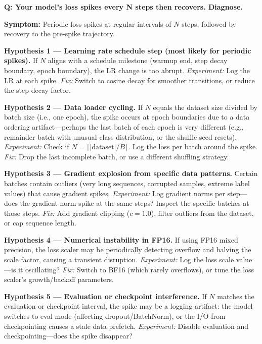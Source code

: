 \begin{interviewq}
\textbf{Q: Your model's loss spikes every N steps then recovers. Diagnose.}

 \quad {} \quad \badgefreq{\freqmed}

\stronganswer

\textbf{Symptom:} Periodic loss spikes at regular intervals of $N$ steps, followed by recovery to the pre-spike trajectory.

\textbf{Hypothesis 1 --- Learning rate schedule step (most likely for periodic spikes).} If $N$ aligns with a schedule milestone (warmup end, step decay boundary, epoch boundary), the LR change is too abrupt. \textit{Experiment:} Log the LR at each spike. \textit{Fix:} Switch to cosine decay for smoother transitions, or reduce the step decay factor.

\textbf{Hypothesis 2 --- Data loader cycling.} If $N$ equals the dataset size divided by batch size (i.e., one epoch), the spike occurs at epoch boundaries due to a data ordering artifact---perhaps the last batch of each epoch is very different (e.g., remainder batch with unusual class distribution, or the shuffle seed resets). \textit{Experiment:} Check if $N = \lceil|\text{dataset}|/B\rceil$. Log the loss per batch around the spike. \textit{Fix:} Drop the last incomplete batch, or use a different shuffling strategy.

\textbf{Hypothesis 3 --- Gradient explosion from specific data patterns.} Certain batches contain outliers (very long sequences, corrupted samples, extreme label values) that cause gradient spikes. \textit{Experiment:} Log gradient norms per step---does the gradient norm spike at the same steps? Inspect the specific batches at those steps. \textit{Fix:} Add gradient clipping ($c = 1.0$), filter outliers from the dataset, or cap sequence length.

\textbf{Hypothesis 4 --- Numerical instability in FP16.} If using FP16 mixed precision, the loss scaler may be periodically detecting overflow and halving the scale factor, causing a transient disruption. \textit{Experiment:} Log the loss scale value---is it oscillating? \textit{Fix:} Switch to BF16 (which rarely overflows), or tune the loss scaler's growth/backoff parameters.

\textbf{Hypothesis 5 --- Evaluation or checkpoint interference.} If $N$ matches the evaluation or checkpoint interval, the spike may be a logging artifact: the model switches to eval mode (affecting dropout/BatchNorm), or the I/O from checkpointing causes a stale data prefetch. \textit{Experiment:} Disable evaluation and checkpointing---does the spike disappear?


\end{interviewq}
